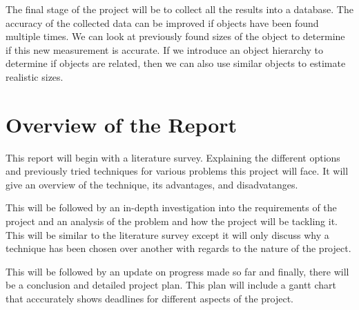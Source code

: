The final stage of the project will be to collect all the results into a database. The accuracy of the collected data can be improved if objects have been found multiple times. We can look at previously found sizes of the object to determine if this new measurement is accurate. If we introduce an object hierarchy to determine if objects are related, then we can also use similar objects to estimate realistic sizes.



\section{Overview of the Report}

This report will begin with a literature survey. Explaining the different options and previously tried techniques for various problems this project will face. It will give an overview of the technique, its advantages, and disadvatanges.

This will be followed by an in-depth investigation into the requirements of the project and an analysis of the problem and how the project will be tackling it. This will be similar to the literature survey except it will only discuss why a technique has been chosen over another with regards to the nature of the project.

This will be followed by an update on progress made so far and finally, there will be a conclusion and detailed project plan. This plan will include a gantt chart that acccurately shows deadlines for different aspects of the project.
